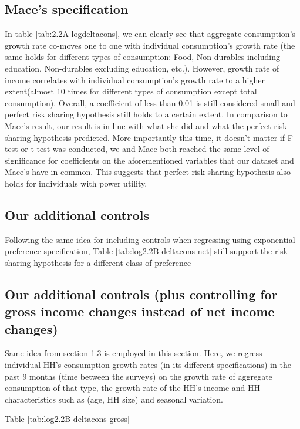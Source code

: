 \documentclass[12pt,a4paper]{article}
\begin{document}
\subsection{Mace's specification}

In table \ref{tab:2.2A-logdeltacons}, we can clearly see that aggregate consumption's growth rate co-moves one to one with individual consumption's growth rate (the same holds for different types of consumption: Food, Non-durables including education, Non-durables excluding education, etc.). However,  growth rate of income correlates with individual consumption's growth rate to a higher extent(almost 10 times for different types of consumption except total consumption). Overall, a coefficient of less than 0.01 is still considered small and perfect risk sharing hypothesis still holds to a certain extent. In comparison to Mace's result, our result is in line with what she did and what the perfect risk sharing hypothesis predicted. More importantly this time, it doesn't matter if F-test or t-test was conducted, we and Mace both reached the same level of significance for coefficients on the aforementioned variables that our dataset and Mace's have in common. This suggests that perfect risk sharing hypothesis also holds for individuals with power utility. 


\subsection{Our additional controls}

Following the same idea for including controls when regressing using exponential preference specification,  Table \ref{tab:log2.2B-deltacons-net} still support the risk sharing hypothesis for a different class of preference 


\subsection{Our additional controls (plus controlling for gross income changes instead of net income changes)}

Same idea from section 1.3 is employed in this section. Here, we regress individual HH's consumption growth rates (in its different specifications) in the past 9 months (time between the surveys) on the growth rate of aggregate consumption of that type, the growth rate of the HH's income and HH characteristics such as (age, HH size) and seasonal variation. 

Table \ref{tab:log2.2B-deltacons-gross}


\clearpage
{}


\end{document}
